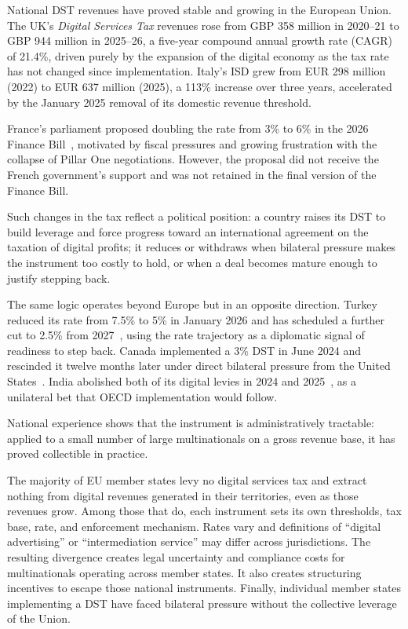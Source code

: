 \documentclass[../../main]{subfiles}
\begin{document}
National DST revenues have proved stable and growing in the European Union.
The UK's \emph{Digital Services Tax} revenues rose from GBP 358 million in 2020--21 to GBP 944 million in 2025--26, a five-year compound annual growth rate (CAGR) %
of 21.4\%, driven purely by the expansion of the digital economy as the tax rate has not changed since implementation.
Italy's ISD grew from EUR 298 million (2022) to EUR 637 million (2025), a 113\% increase over three years, accelerated by the January 2025 removal of its domestic revenue threshold.


France's parliament proposed doubling the rate from 3\% to 6\% in the 2026 Finance Bill~\citep{legifrance_plf2026,assemblee_nationale_plf2026_amdt655}, motivated by fiscal pressures and growing frustration with the collapse of Pillar One negotiations.
However, the proposal did not receive the French government's support and was not retained in the final version of the Finance Bill.

Such changes in the tax reflect a political position: a country raises its DST to build leverage and force progress toward an international agreement on the taxation of digital profits; it reduces or withdraws when bilateral pressure makes the instrument too costly to hold, or when a deal becomes mature enough to justify stepping back.

The same logic operates beyond Europe but in an opposite direction.
Turkey reduced its rate from 7.5\% to 5\% in January 2026 and has scheduled a further cut to 2.5\% from 2027~\citep{tax_foundation_dst_tracker_2026}, using the rate trajectory as a diplomatic signal of readiness to step back.
Canada implemented a 3\% DST in June 2024 and rescinded it twelve months later under direct bilateral pressure from the United States~\citep{canada_finance_rescission_jun2025}.
India abolished both of its digital levies in 2024 and 2025~\citep{india_briefing_el2_abolition,india_briefing_el1_abolition}, as a unilateral bet that OECD implementation would follow.

National experience shows that the instrument is administratively tractable: applied to a small number of large multinationals on a gross revenue base, it has proved collectible in practice.

The majority of EU member states levy no digital services tax and extract nothing from digital revenues generated in their territories, even as those revenues grow.
Among those that do, each instrument sets its own thresholds, tax base, rate, and enforcement mechanism.
Rates vary and definitions of ``digital advertising'' or ``intermediation service'' may differ across jurisdictions.
The resulting divergence creates legal uncertainty and compliance costs for multinationals operating across member states.
It also creates structuring incentives to escape those national instruments.
Finally, individual member states implementing a DST have faced bilateral pressure without the collective leverage of the Union. 
\end{document}
